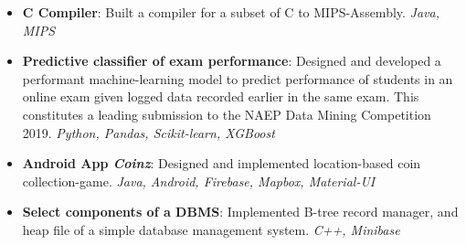 \documentclass[11pt]{article}
\begin{document}
\begin{itemize}
    \item \textbf{C Compiler}:
        Built a compiler for a subset of C to MIPS-Assembly. \textit{Java, MIPS}
    \item \textbf{Predictive classifier of exam performance}:
        Designed and developed a performant machine-learning model to predict performance
        of students in an online exam given logged data recorded earlier in the same exam.
        This constitutes a leading submission to the NAEP Data Mining Competition 2019.
        \textit{Python, Pandas, Scikit-learn, XGBoost}
    \item \textbf{Android App \emph{Coinz}}:
        Designed and implemented location-based coin collection-game. \textit{Java,
        Android, Firebase, Mapbox, Material-UI}
    \item \textbf{Select components of a DBMS}:
        Implemented B-tree record manager, and heap file of a simple database management
        system. \textit{C++, Minibase}

\end{itemize}
\end{document}
